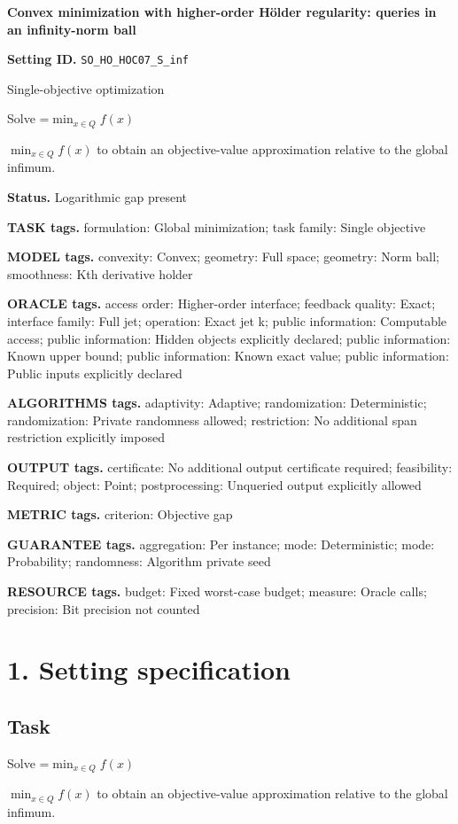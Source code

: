\documentclass[10pt,a4paper]{article}
\newcommand{\AtlasMath}[1]{\par\begingroup\centering\setbox0=\hbox{$\displaystyle #1$}\ifdim\wd0>1.4\linewidth\typeout{ATLAS WIDE FORMULA: \the\wd0}\fi\ifdim\wd0>\linewidth\resizebox{\linewidth}{!}{\box0}\else\box0\fi\par\endgroup}
\newcommand{\AtlasInlineMath}[1]{\begingroup\setbox0=\hbox{$#1$}\ifdim\wd0>.4\linewidth\endgroup\AtlasMath{#1}\else\endgroup$#1$\fi}
\begin{document}
\raggedright

{\LARGE\bfseries\sffamily\color{AtlasNavy} Convex minimization with higher-order Hölder regularity: queries in an infinity-norm ball\par}\vspace{5pt}
\textbf{Setting ID.} \texttt{SO\_\allowbreak{}HO\_\allowbreak{}HOC07\_\allowbreak{}S\_\allowbreak{}inf}

Single-objective optimization

Solve \AtlasInlineMath{\min_{x\in Q}f(x)} to obtain an objective-value approximation relative to the global infimum.

\textbf{Status.} Logarithmic gap present

\textbf{TASK tags.} formulation: Global minimization; task family: Single objective

\textbf{MODEL tags.} convexity: Convex; geometry: Full space; geometry: Norm ball; smoothness: Kth derivative holder

\textbf{ORACLE tags.} access order: Higher-order interface; feedback quality: Exact; interface family: Full jet; operation: Exact jet k; public information: Computable access; public information: Hidden objects explicitly declared; public information: Known upper bound; public information: Known exact value; public information: Public inputs explicitly declared

\textbf{ALGORITHMS tags.} adaptivity: Adaptive; randomization: Deterministic; randomization: Private randomness allowed; restriction: No additional span restriction explicitly imposed

\textbf{OUTPUT tags.} certificate: No additional output certificate required; feasibility: Required; object: Point; postprocessing: Unqueried output explicitly allowed

\textbf{METRIC tags.} criterion: Objective gap

\textbf{GUARANTEE tags.} aggregation: Per instance; mode: Deterministic; mode: Probability; randomness: Algorithm private seed

\textbf{RESOURCE tags.} budget: Fixed worst-case budget; measure: Oracle calls; precision: Bit precision not counted

\section{1. Setting specification}
\subsection{Task}
Solve \AtlasInlineMath{\min_{x\in Q}f(x)} to obtain an objective-value approximation relative to the global infimum.
\end{document}
